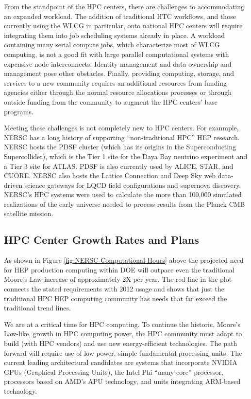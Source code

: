 From the standpoint of the HPC centers, there are challenges to accommodating an expanded workload. The addition of traditional HTC workflows, and those currently using the WLCG in particular, onto 
national HPC centers will require integrating them into job scheduling systems already in place. 
A workload containing many serial compute jobs, which characterize most of WLCG computing, 
is not a good fit with large parallel computational systems with expensive node interconnects. 
Identity management and data ownership and management pose other obstacles. Finally, providing 
computing, storage, and services to a new community requires an additional resources from 
funding agencies either through the normal resource allocations processes or through outside 
funding from the community to augment the HPC centers’ base programs.
 
Meeting these challenges is not completely new to HPC centers. For exanmple,
NERSC has a long history of supporting “non-traditional HPC” HEP research.  
NERSC hosts the PDSF cluster (which has its origins in the Superconducting Supercollider), 
which is the Tier 1 site for the Daya Bay neutrino experiment and 
a Tier 3 site for ATLAS. PDSF is also currently used by ALICE, STAR, and CUORE. 
 NERSC also hosts the Lattice Connection and Deep Sky web data-driven science gateways for 
LQCD field configurations  and supernova discovery. 
NERSC’s HPC systems were used to calculate the more than 100,000 simulated realizations of the 
early universe needed to process results from the Planck CMB satellite mission. 


\subsection{HPC Center Growth Rates and Plans}
 
As shown in Figure \ref{fig:NERSC-Computational-Hours} above the projected need for HEP production computing within DOE will outpace even the traditional Moore's Law increase of approximately 2X per year.  The red line in the plot connects the stated requirements with 2012 usage and shows that just the traditional HPC HEP computing community has needs that far exceed the traditional trend lines. 
 
We are at a critical time for HPC computing. To continue the historic, Moore's Law-like, growth in HPC computing power, the HPC community must adapt to build (with HPC vendors) and use new energy-efficient technologies. The path forward will require use of low-power, simple fundamental processing units. The current leading architectural candidates are systems that incorporate NVIDIA GPUs (Graphical Processing Units), the Intel Phi “many-core” processor, processors based on AMD's APU technology, and units integrating ARM-based technology.

